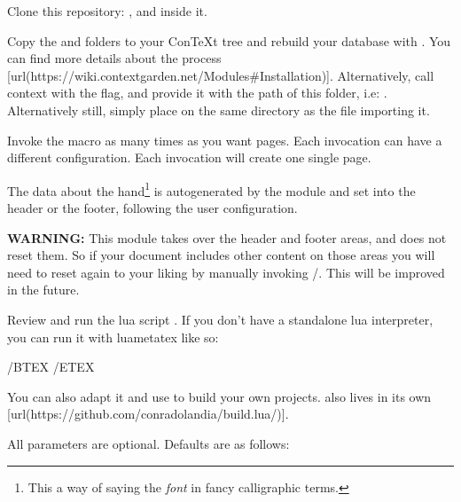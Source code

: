 \startenumerate[n,packed][stopper=.]
\item
  Clone this repository: , and  inside it.
\item
  Copy the  and  folders to your ConTeXt tree and rebuild your database with . You can find more details about the process [url(https://wiki.contextgarden.net/Modules\#Installation)]. Alternatively, call context with the  flag, and provide it with the path of this folder, i.e: . Alternatively still, simply place  on the same directory as the file importing it.
\item
  Invoke the \type{\Pauta} macro as many times as you want pages. Each invocation can have a different configuration. Each invocation will create one single page.
\item
  The data about the hand\footnote{This a way of saying the {\em font} in fancy calligraphic terms.} is autogenerated by the module and set into the header or the footer, following the user configuration.
\item
  {\bf WARNING:} This module takes over the header and footer areas, and does not reset them. So if your document includes other content on those areas you will need to reset again to your liking by manually invoking \type{\setupheadertexts}/\type{\setupfooterrtexts}. This will be improved in the future.
\stopenumerate

\stopsection

\startsection[title={Generating the example file},reference={generating-the-example-file}]

Review and run the lua script . If you don't have a standalone lua interpreter, you can run it with luametatex like so:

\starthighlighting
/BTEX /ETEX
\stophighlighting

You can also adapt it and use to build your own projects.  also lives in its own [url(https://github.com/conradolandia/build.lua/)].

\stopsection

\startsection[title={Configuration Parameters},reference={configuration-parameters}]

All parameters are optional. Defaults are as follows:

